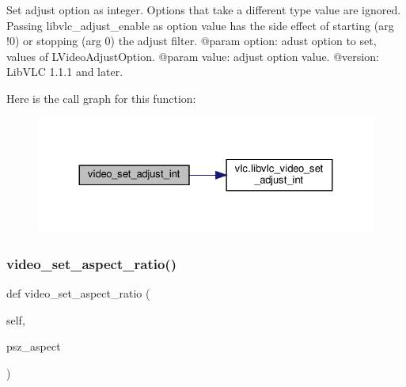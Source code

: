 \begin{DoxyVerb}Set adjust option as integer. Options that take a different type value
are ignored.
Passing libvlc_adjust_enable as option value has the side effect of
starting (arg !0) or stopping (arg 0) the adjust filter.
@param option: adust option to set, values of L{VideoAdjustOption}.
@param value: adjust option value.
@version: LibVLC 1.1.1 and later.
\end{DoxyVerb}
 Here is the call graph for this function\+:
\nopagebreak
\begin{figure}[H]
\begin{center}
\leavevmode
\includegraphics[width=324pt]{classvlc_1_1_media_player_ad8f3725ce406170a3703805dae8733f1_cgraph}
\end{center}
\end{figure}
\mbox{\label{classvlc_1_1_media_player_af2cb8a29a559902d75d2b58dcad3e938}} 
\subsubsection{\texorpdfstring{video\+\_\+set\+\_\+aspect\+\_\+ratio()}{video\_set\_aspect\_ratio()}}
{\footnotesize\ttfamily def video\+\_\+set\+\_\+aspect\+\_\+ratio (\begin{DoxyParamCaption}\item[{}]{self,  }\item[{}]{psz\+\_\+aspect }\end{DoxyParamCaption})}


